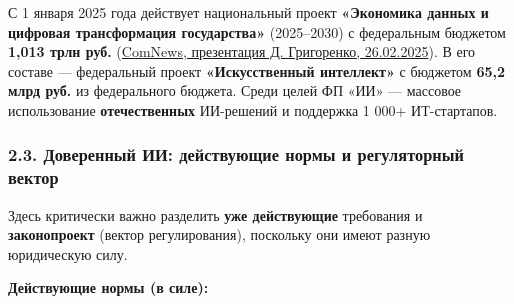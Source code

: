 \documentclass[
  russian,
]{article}
\begin{document}
С 1 января 2025 года действует национальный проект \textbf{«Экономика
данных и цифровая трансформация государства»} (2025--2030) с федеральным
бюджетом \textbf{1,013 трлн руб.}
(\href{https://www.comnews.ru/content/238087/2025-03-05/2025-w10/1007/nacproekt-ekonomika-dannykh-privlechet-14-trln-rub}{ComNews,
презентация Д. Григоренко, 26.02.2025}). В его составе --- федеральный
проект \textbf{«Искусственный интеллект»} с бюджетом \textbf{65,2 млрд
руб.} из федерального бюджета. Среди целей ФП «ИИ» --- массовое
использование \textbf{отечественных} ИИ-решений и поддержка 1 000+
ИТ-стартапов.

\subsubsection{2.3. Доверенный ИИ: действующие нормы и регуляторный
вектор}\label{ux434ux43eux432ux435ux440ux435ux43dux43dux44bux439-ux438ux438-ux434ux435ux439ux441ux442ux432ux443ux44eux449ux438ux435-ux43dux43eux440ux43cux44b-ux438-ux440ux435ux433ux443ux43bux44fux442ux43eux440ux43dux44bux439-ux432ux435ux43aux442ux43eux440}

Здесь критически важно разделить \textbf{уже действующие} требования и
\textbf{законопроект} (вектор регулирования), поскольку они имеют разную
юридическую силу.

\textbf{Действующие нормы (в силе):}
\end{document}
